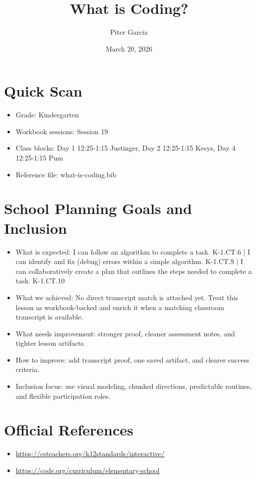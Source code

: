 \documentclass[11pt]{article}
\title{What is Coding?}
\author{Piter Garcia}
\date{March 20, 2026}
\begin{document}
    \maketitle
    \section*{Quick Scan}
    \begin{itemize}[leftmargin=*]
    \item Grade: Kindergarten
    \item Workbook sessions: Session 19
    \item Class blocks: Day 1 12:25-1:15 Justinger, Day 2 12:25-1:15 Kesys, Day 4 12:25-1:15 Pum
    \item Reference file: what-is-coding.bib
    \end{itemize}
    \section*{School Planning Goals and Inclusion}
    \begin{itemize}[leftmargin=*]
    \item What is expected: I can follow an algorithm to complete a task. K-1.CT.6 | I can identify and fix (debug) errors within a simple algorithm. K-1.CT.9 | I can collaboratively create a plan that outlines the steps needed to complete a task. K-1.CT.10
    \item What we achieved: No direct transcript match is attached yet. Treat this lesson as workbook-backed and enrich it when a matching classroom transcript is available.
    \item What needs improvement: stronger proof, cleaner assessment notes, and tighter lesson artifacts.
    \item How to improve: add transcript proof, one saved artifact, and clearer success criteria.
    \item Inclusion focus: use visual modeling, chunked directions, predictable routines, and flexible participation roles.
    \end{itemize}
    \section*{Official References}
    \begin{itemize}[leftmargin=*]
    \item \url{https://csteachers.org/k12standards/interactive/}
\item \url{https://code.org/curriculum/elementary-school}

    \end{itemize}
    
\end{document}
